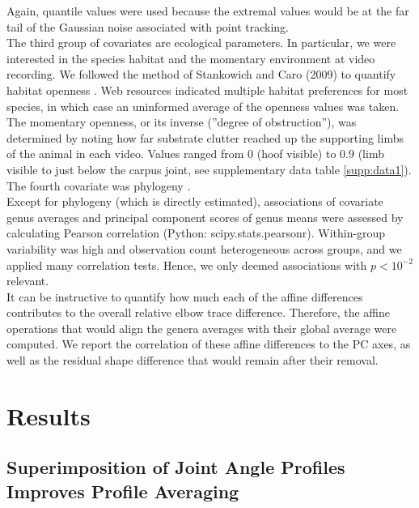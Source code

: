 Again, quantile values were used because the extremal values would be at the far tail of the Gaussian noise associated with point tracking.
\\The third group of covariates are ecological parameters.
In particular, we were interested in the species habitat and the momentary environment at video recording.
We followed the method of Stankowich and Caro (2009) to quantify habitat openness \citep{Caro2004,Stankowich2009}.
Web resources indicated multiple habitat preferences for most species, in which case an uninformed average of the openness values was taken.
The momentary openness, or its inverse (''degree of obstruction''), was determined by noting how far substrate clutter reached up the supporting limbs of the animal in each video.
Values ranged from $0$ (hoof visible) to $0.9$ (limb visible to just below the carpus joint, see supplementary data table \ref*{supp:data1}).
\\The fourth covariate was phylogeny \cite[see appendix \ref{apdx:phylosig} and Fig. \ref*{fig:phylogeny};][]{Zurano2019,Adams2014}.
\smallskip\\Except for phylogeny (which is directly estimated), associations of covariate genus averages and principal component scores of genus means \citep{Mitteroecker2011} were assessed by calculating Pearson correlation (Python: \textsf{scipy.stats.pearsonr}).
Within-group variability was high and observation count heterogeneous across groups, and we applied many correlation tests.
Hence, we only deemed associations with $p<10^{-2}$ relevant.
\\It can be instructive to quantify how much each of the affine differences contributes to the overall relative elbow trace difference.
Therefore, the affine operations that would align the genera averages with their global average were computed.
We report the correlation of these affine differences to the PC axes, as well as the residual shape difference that would remain after their removal.



\FloatBarrier\pagebreak
\section{Results}
\subsection{Superimposition of Joint Angle Profiles Improves Profile Averaging}

